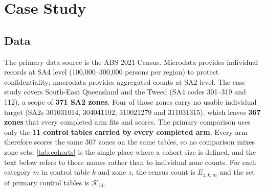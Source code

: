 \documentclass[review]{elsarticle}
\begin{document}
\FloatBarrier


\section{Case Study}
\subsection{Data} \label{sec:casestudy}
The primary data source is the ABS 2021 Census. Microdata provides individual records at SA4 level (100{,}000--300{,}000 persons per region) to protect confidentiality; macrodata provides aggregated counts at SA2 level. The case study covers South-East Queensland and the Tweed (SA4 codes 301--319 and 112), a scope of \textbf{371 SA2 zones}. Four of those zones carry no usable individual target (SA2s 301031014, 304041102, 310021279 and 311031315), which leaves \textbf{367 zones} that every completed arm fits and scores. The primary comparison uses only the \textbf{11 control tables carried by every completed arm}. Every arm therefore scores the same 367 zones on the same tables, so no comparison mixes zone sets: \cref{tab:cohorts} is the single place where a cohort size is defined, and the text below refers to those names rather than to individual zone counts. For each category $m$ in control table $k$ and zone $z$, the census count is $E_{z,k,m}$ and the set of primary control tables is $\mathcal{K}_{11}$.
\end{document}
